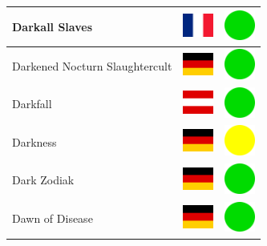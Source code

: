 \documentclass[12pt, a4paper, twoside]{report}
\begin{document}
\begin{center}
\begin{longtable}{|p{5cm}|p{2cm}|p{2cm}|}
 Darkall Slaves                                             & \includegraphics[width=1cm]{../4x3/fr} &   \includegraphics[width=1cm]{../likes/y} \\ \hline
 Darkened Nocturn Slaughtercult                             & \includegraphics[width=1cm]{../4x3/de} &   \includegraphics[width=1cm]{../likes/y} \\ \hline
 Darkfall                                                   & \includegraphics[width=1cm]{../4x3/at} &   \includegraphics[width=1cm]{../likes/y} \\ \hline
 Darkness                                                   & \includegraphics[width=1cm]{../4x3/de} &   \includegraphics[width=1cm]{../likes/m} \\ \hline
 Dark Zodiak                                                & \includegraphics[width=1cm]{../4x3/de} &   \includegraphics[width=1cm]{../likes/y} \\ \hline
 Dawn of Disease                                            & \includegraphics[width=1cm]{../4x3/de} &   \includegraphics[width=1cm]{../likes/y} \\ \hline

\end{longtable}
\end{center}
\end{document}
